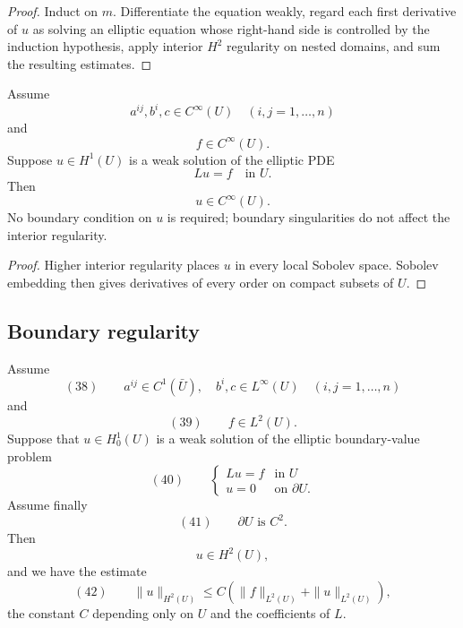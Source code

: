 \begin{proof}
\sketch Induct on $m$. Differentiate the equation weakly, regard each first derivative of $u$ as solving an elliptic equation whose right-hand side is controlled by the induction hypothesis, apply interior $H^2$ regularity on nested domains, and sum the resulting estimates.
\end{proof}

\begin{theorem}
\label{thm:interior-infinite-differentiability}

Assume
$$a^{ij}, b^i, c \in C^\infty(U) \quad (i,j=1,\ldots,n)$$
and
$$f \in C^\infty(U).$$
Suppose $u \in H^1(U)$ is a weak solution of the elliptic PDE
$$Lu = f \quad \text{in } U.$$
Then
$$u \in C^\infty(U).$$
No boundary condition on $u$ is required; boundary singularities do not affect the interior regularity.
\end{theorem}

\begin{proof}
\sketch Higher interior regularity places $u$ in every local Sobolev space. Sobolev embedding then gives derivatives of every order on compact subsets of $U$.
\end{proof}

\subsection{Boundary regularity}

\begin{theorem}
\label{thm:boundary-h2-regularity}

Assume
$$(38) \qquad a^{ij} \in C^1(\bar U), \quad b^i,c \in L^\infty(U) \quad (i,j=1,\ldots,n)$$
and
$$(39) \qquad f \in L^2(U).$$
Suppose that $u \in H_0^1(U)$ is a weak solution of the elliptic boundary-value problem
$$(40) \qquad \begin{cases} Lu = f & \text{in } U \\ u = 0 & \text{on } \partial U. \end{cases}$$
Assume finally
$$(41) \qquad \partial U \text{ is } C^2.$$
Then
$$u \in H^2(U),$$
and we have the estimate
$$(42) \qquad \|u\|_{H^2(U)} \leq C(\|f\|_{L^2(U)}+\|u\|_{L^2(U)}),$$
the constant $C$ depending only on $U$ and the coefficients of $L$.
\end{theorem}

